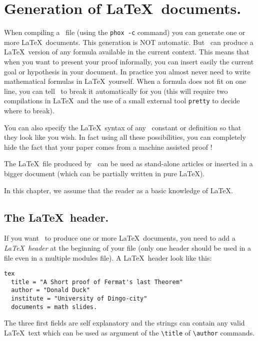 
\chapter{Generation of \LaTeX\ documents.}\label{tex}

When compiling a \AFD\ file (using the \verb#phox -c# command) you can 
generate one or more \LaTeX\ documents. This generation is NOT automatic. But
\AFD\ can produce a \LaTeX\ version of any formula available in the current
context. This means that when you want to present your proof informally, you
can insert easily the current goal or hypothesis in your document. In practice
you almost never need to write mathematical formulas in \LaTeX\ yourself. When
a formula does not fit on one line, you can tell \AFD\ to break it
automatically for you (this will require two compilations in \LaTeX\ and the
use of a small external tool {\tt pretty} to decide where to break).

You can also specify the \LaTeX\ syntax of any \AFD\ constant or definition so
that they look like you wish. In fact using all these possibilities, you can
completely hide the fact that your paper comes from a machine assisted proof !

The \LaTeX\ file produced by \AFD\ can be used as stand-alone articles or
inserted in a bigger document (which can be partially written in
pure \LaTeX).

In this chapter, we assume that the reader as a basic knowledge of \LaTeX.

\section{The \LaTeX\ header.}

If you want \AFD\ to produce one or more \LaTeX\ documents, you need to add a
  {\em \LaTeX\ header} at the beginning of your file (only one header
  should be used in a file even in a multiple modules file).
A \LaTeX\ header look like this:

\begin{verbatim}
tex
  title = "A Short proof of Fermat's last Theorem"
  author = "Donald Duck"
  institute = "University of Dingo-city"
  documents = math slides.
\end{verbatim}

The three first fields are self explanatory and the strings can contain any
valid \LaTeX\ text which can be used as argument of the \verb#\title# of
\verb#\author# commands. 

